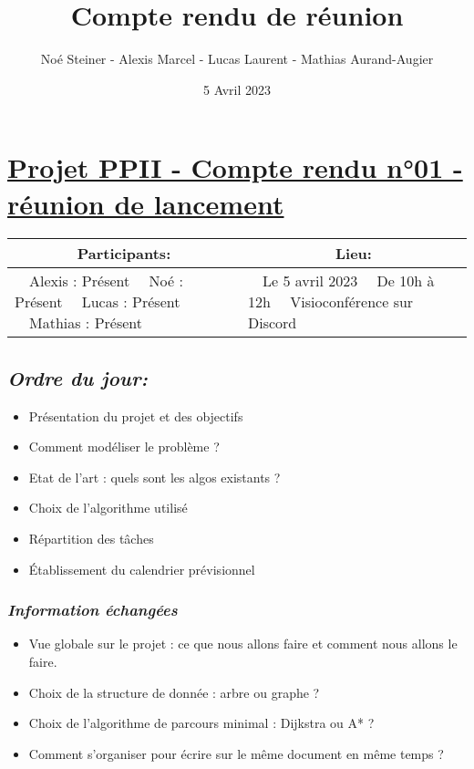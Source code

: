 \documentclass[french,a4paper]{article}
\author{Noé Steiner - Alexis Marcel - Lucas Laurent - Mathias Aurand-Augier}
\date{5 Avril 2023}
\newcommand{\tabitem}{\textbullet~~}\title{Compte rendu de réunion}
\begin{document}
\maketitle

\section*{\underline{Projet PPII - Compte rendu n°01 - réunion de lancement}}

\begin{table}[!htb]
  \centering
  \begin{tabular}{| p{7cm} | p{7cm} |}
    \hline
    \multicolumn{1}{|c|}{ Participants:} & \multicolumn{1}{c|}{Lieu:} \\
    \hline
    \tabitem Alexis : Présent\newline
    \tabitem Noé : Présent\newline
    \tabitem Lucas : Présent\newline
    \tabitem Mathias : Présent                      &
    \tabitem Le 5 avril 2023\newline
    \tabitem De 10h à 12h\newline
    \tabitem Visioconférence sur Discord                                         \\
    \hline
  \end{tabular}
\end{table}

\subsection*{\textit{Ordre du jour:}}

\begin{itemize}
  \item Présentation du projet et des objectifs
  \item Comment modéliser le problème ?
  \item Etat de l'art : quels sont les algos existants ?
  \item Choix de l'algorithme utilisé
  \item Répartition des tâches
  \item Établissement du calendrier prévisionnel
\end{itemize}


\subsubsection*{\textit{Information échangées}}
\begin{itemize}
  \item Vue globale sur le projet : ce que nous allons faire et comment nous allons le faire.
  \item Choix de la structure de donnée : arbre ou graphe ?
  \item Choix de l'algorithme de parcours minimal : Dijkstra ou A* ?
  \item Comment s'organiser pour écrire sur le même document en même temps ?
\end{itemize}
\end{document}

